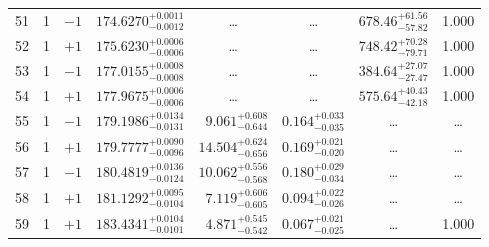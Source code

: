 \begin{table*}[!]
\begin{tabular}{llcrrlrc}
51 & 1 & $-1$ & $    174.6270_{-      0.0012}^{+      0.0011}$ & \multicolumn{1}{c}{\dots} & \multicolumn{1}{c}{\dots} & $      678.46_{-       57.82}^{+       61.56}$ & 1.000\\[1pt]
52 & 1 & $+1$ & $    175.6230_{-      0.0006}^{+      0.0006}$ & \multicolumn{1}{c}{\dots} & \multicolumn{1}{c}{\dots} & $      748.42_{-       79.71}^{+       70.28}$ & 1.000\\[1pt]
53 & 1 & $-1$ & $    177.0155_{-      0.0008}^{+      0.0008}$ & \multicolumn{1}{c}{\dots} & \multicolumn{1}{c}{\dots} & $      384.64_{-       27.47}^{+       27.07}$ & 1.000\\[1pt]
54 & 1 & $+1$ & $    177.9675_{-      0.0006}^{+      0.0006}$ & \multicolumn{1}{c}{\dots} & \multicolumn{1}{c}{\dots} & $      575.64_{-       42.18}^{+       40.43}$ & 1.000\\[1pt]
55 & 1 & $-1$ & $    179.1986_{-      0.0131}^{+      0.0134}$ & $       9.061_{-       0.644}^{+       0.608}$ & $       0.164_{-       0.035}^{+       0.033}$ & \multicolumn{1}{c}{\dots} & \dots \\[1pt]
56 & 1 & $+1$ & $    179.7777_{-      0.0096}^{+      0.0090}$ & $      14.504_{-       0.656}^{+       0.624}$ & $       0.169_{-       0.020}^{+       0.021}$ & \multicolumn{1}{c}{\dots} & \dots \\[1pt]
57 & 1 & $-1$ & $    180.4819_{-      0.0124}^{+      0.0136}$ & $      10.062_{-       0.568}^{+       0.556}$ & $       0.180_{-       0.034}^{+       0.029}$ & \multicolumn{1}{c}{\dots} & \dots \\[1pt]
58 & 1 & $+1$ & $    181.1292_{-      0.0104}^{+      0.0095}$ & $       7.119_{-       0.605}^{+       0.606}$ & $       0.094_{-       0.026}^{+       0.022}$ & \multicolumn{1}{c}{\dots} & \dots \\[1pt]
59 & 1 & $+1$ & $    183.4341_{-      0.0101}^{+      0.0104}$ & $       4.871_{-       0.542}^{+       0.545}$ & $       0.067_{-       0.025}^{+       0.021}$ & \multicolumn{1}{c}{\dots} & 1.000\\[1pt]
\hline
\end{tabular}
\end{table*}


